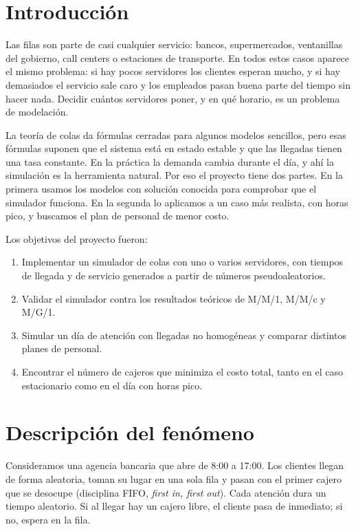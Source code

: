 \documentclass[11pt,letterpaper]{article}
\begin{document}
\newpage
\tableofcontents
\newpage
{}

\section{Introducción}
Las filas son parte de casi cualquier servicio: bancos, supermercados, ventanillas del
gobierno, call centers o estaciones de transporte. En todos estos casos aparece el mismo
problema: si hay pocos servidores los clientes esperan mucho, y si hay demasiados el
servicio sale caro y los empleados pasan buena parte del tiempo sin hacer nada. Decidir
cuántos servidores poner, y en qué horario, es un problema de modelación.

La teoría de colas da fórmulas cerradas para algunos modelos sencillos, pero esas fórmulas
suponen que el sistema está en estado estable y que las llegadas tienen una tasa constante.
En la práctica la demanda cambia durante el día, y ahí la simulación es la herramienta
natural. Por eso el proyecto tiene dos partes. En la primera usamos los modelos con
solución conocida para comprobar que el simulador funciona. En la segunda lo aplicamos a
un caso más realista, con horas pico, y buscamos el plan de personal de menor costo.

Los objetivos del proyecto fueron:
\begin{enumerate}[noitemsep]
  \item Implementar un simulador de colas con uno o varios servidores, con tiempos de
        llegada y de servicio generados a partir de números pseudoaleatorios.
  \item Validar el simulador contra los resultados teóricos de M/M/1, M/M/c y M/G/1.
  \item Simular un día de atención con llegadas no homogéneas y comparar distintos planes
        de personal.
  \item Encontrar el número de cajeros que minimiza el costo total, tanto en el caso
        estacionario como en el día con horas pico.
\end{enumerate}

\section{Descripción del fenómeno}
Consideramos una agencia bancaria que abre de 8:00 a 17:00. Los clientes llegan de forma
aleatoria, toman su lugar en una sola fila y pasan con el primer cajero que se desocupe
(disciplina FIFO, \emph{first in, first out}). Cada atención dura un tiempo aleatorio. Si
al llegar hay un cajero libre, el cliente pasa de inmediato; si no, espera en la fila.
\end{document}
